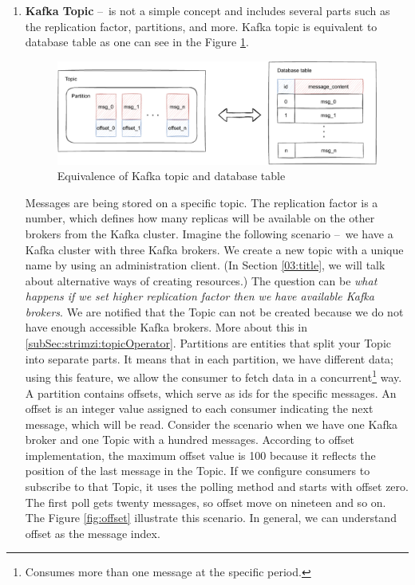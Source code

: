 \begin{enumerate}
    \item \textbf{Kafka Topic} \---\ is not a simple concept and includes several parts such as the replication factor, partitions, and more.
    Kafka topic is equivalent to database table as one can see in the Figure \ref{fig:topicAndDatabaseTable}.
     \begin{figure}[!ht]
    \centering
    \includegraphics[scale=0.80]{obrazky-figures/02-preliminaries/02-kafka/03-database-relation.pdf}
    \caption{Equivalence of Kafka topic and database table}
    \label{fig:topicAndDatabaseTable}
    \end{figure}

    Messages are being stored on a specific topic.
    The replication factor is a number, which defines how many replicas will be available on the other brokers from the Kafka cluster.
    Imagine the following scenario \---\ we have a Kafka cluster with three Kafka brokers.
    We create a new topic with a unique name by using an administration client. (In Section \ref{03:title}, we will talk about alternative ways of creating resources.) The question can be \emph{what happens if we set higher replication factor then we have available Kafka brokers}.
    We are notified that the Topic can not be created because we do not have enough accessible Kafka brokers.
    More about this in \ref{subSec:strimzi:topicOperator}.
    Partitions are entities that split your Topic into separate parts.
    It means that in each partition, we have different data; using this feature, we allow the consumer to fetch data in a concurrent\footnote{Consumes more than one message at the specific period.} way.
    A partition contains offsets, which serve as ids for the specific messages.
    An offset is an integer value assigned to each consumer indicating the next message, which will be read.
    Consider the scenario when we have one Kafka broker and one Topic with a hundred messages.
    According to offset implementation, the maximum offset value is 100 because it reflects the position of the last message in the Topic.
    If we configure consumers to subscribe to that Topic, it uses the polling method and starts with offset zero.
    The first poll gets twenty messages, so offset move on nineteen and so on. The Figure  \ref{fig:offset} illustrate this scenario.
    In general, we can understand offset as the message index.
    

\end{enumerate}
